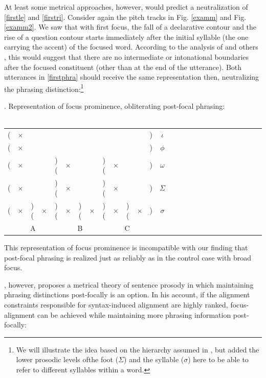 \documentclass[preprint,review,12pt,authoryear,times]{elsarticle}
\newcommand{\g}{$\times$}
\begin{document}
At least some metrical approaches, however, would predict a neutralization of \ref{firstle} and \ref{firstri}. Consider again the pitch tracks in Fig. \ref{examm} and Fig.  \ref{examm2}. We saw that with first focus, the fall of a declarative contour and the rise of a question contour starts immediately after the initial syllable (the one carrying the accent) of the focused word.  According to the analysis of \citet{pierr80} and others \citep[e.g.][]{beckm96}, this would suggest that there are no intermediate or intonational boundaries after the focused constituent (other than at the end of the utterance). Both utterances in \ref{firstphra} should receive the same representation then, neutralizing the phrasing distinction:\footnote{We will illustrate the idea based on the hierarchy assumed in \citet[][]{fery13}, but added the lower prosodic levels  ofthe foot ($\Sigma$) and the syllable ($\sigma$) here to be able to refer to different syllables within a word.}


\ex. Representation of focus prominence, obliterating post-focal phrasing:\\
\vspace{-10pt}\footnotesize
\ \\
\vspace{-12pt}
\setlength{\unitlength}{1cm}
\setlength\extrarowheight{-3pt}
\begin{tabular}{ccccccccccccccccccccccccccc}
 (&\g&&&&&&&&&&&)&\em $\iota$\\
(&\g&&&&&&&&&&&)&$\phi$\\
(&\g&&&)(&\g&&&)(&\g&&&)&$\omega$\\
(&\g&&&)(&\g&&&)(&\g&&&)&$\Sigma$\\
(&\g&)(&\g&)(&\g&)(&\g&)(&\g&)(&\g&)&$\sigma$\\
\multicolumn{5}{c}{A}&\multicolumn{3}{c}{B}&\multicolumn{5}{c}{C}\\
\end{tabular}
\vspace{15pt}

This representation of focus prominence is incompatible with our finding that post-focal phrasing is realized just as reliably as in the control case with broad focus. 

\citet{truck95}, however, proposes a metrical theory of sentence prosody in which maintaining phrasing distinctions post-focally is an option. In his account, if the alignment constraints responsible for syntax-induced alignment are highly ranked, focus-alignment can be achieved while maintaining more phrasing information post-focally:
\end{document}
